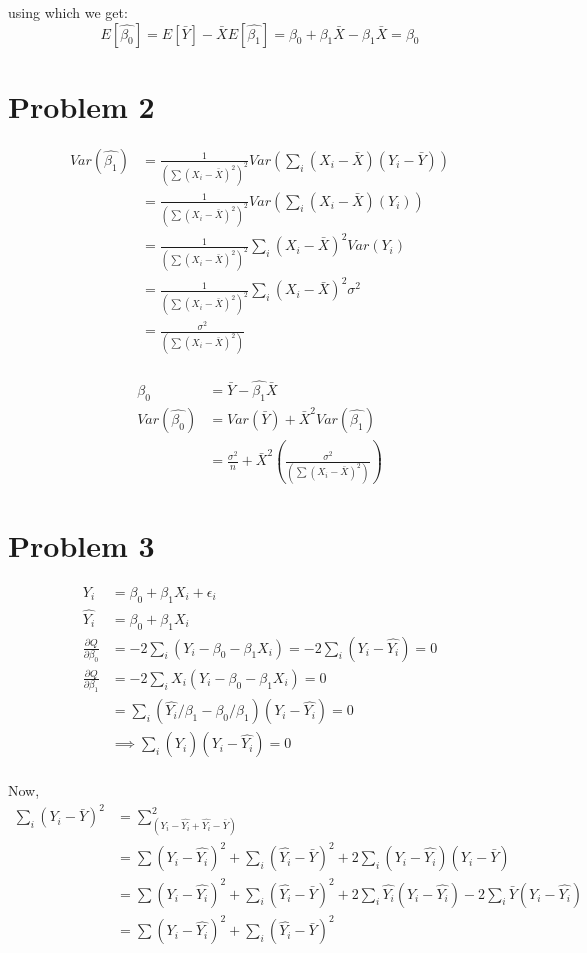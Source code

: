 \documentclass[a4paper]{article}
\begin{document}
using which we get:
$$
E[\hat{\beta_0}] = E[\bar{Y}]-\bar{X}E[\hat{\beta_1}] = \beta_0 + \beta_1 \bar{X} - \beta_1\bar{X} = \beta_0
$$

\section*{Problem 2}
\begin{align*}
Var(\hat{\beta_1}) &= \frac{1}{(\sum(X_i-\bar{X})^2)^2} Var(\sum_i(X_i-\bar{X})(Y_i-\bar{Y}))\\
&=\frac{1}{(\sum(X_i-\bar{X})^2)^2} Var(\sum_i(X_i-\bar{X})(Y_i))\\
&= \frac{1}{(\sum(X_i-\bar{X})^2)^2} \sum_i(X_i-\bar{X})^2Var(Y_i)\\ 
&= \frac{1}{(\sum(X_i-\bar{X})^2)^2} \sum_i(X_i-\bar{X})^2\sigma^2\\ 
&= \frac{\sigma^2}{(\sum(X_i-\bar{X})^2)}\\ 
\end{align*}

\begin{align*}
\hat{\beta_0} &= \bar{Y}-\hat{\beta_1}\bar{X}\\
Var(\hat{\beta_0}) &= Var(\bar{Y}) + \bar{X}^2Var(\hat{\beta_1})\\
&= \frac{\sigma^2}{n} + \bar{X}^2(\frac{\sigma^2}{(\sum(X_i-\bar{X})^2)})
\end{align*}

\section*{Problem 3}
\begin{align*}
Y_i &= \beta_0 + \beta_1X_i + \epsilon_i\\
\hat{Y_i} &= {\beta_0} + {\beta_1}X_i\\
\frac{\partial Q}{\partial \beta_0} &= -2\sum_i(Y_i - \beta_0-\beta_1X_i)=-2\sum_i(Y_i - \hat{Y_i})=0\\
\frac{\partial Q}{\partial \beta_1} &= -2\sum_iX_i(Y_i - \beta_0-\beta_1X_i)=0\\
&= \sum_i(\hat{Y_i}/\beta_1-\beta_0/\beta_1)(Y_i-\hat{Y_i})=0\\
&\implies \sum_i(\hat{Y_i})(Y_i-\hat{Y_i})=0\\
\end{align*}


Now, 
\begin{align*}
\sum_i(Y_i-\bar{Y})^2 &= \sum_(Y_i-\hat{Y_i}+\hat{Y_i}-\bar{Y})^2\\
&= \sum(Y_i-\hat{Y_i})^2+\sum_i(\hat{Y_i}-\bar{Y})^2 + 2\sum_i(Y_i-\hat{Y_i})(\hat{Y_i}-\bar{Y})\\
&= \sum(Y_i-\hat{Y_i})^2+\sum_i(\hat{Y_i}-\bar{Y})^2 + 2\sum_i\hat{Y_i}(Y_i-\hat{Y_i}) - 2\sum_i\bar{Y}(Y_i-\hat{Y_i})\\
&= \sum(Y_i-\hat{Y_i})^2+\sum_i(\hat{Y_i}-\bar{Y})^2 
\end{align*}
\end{document}
